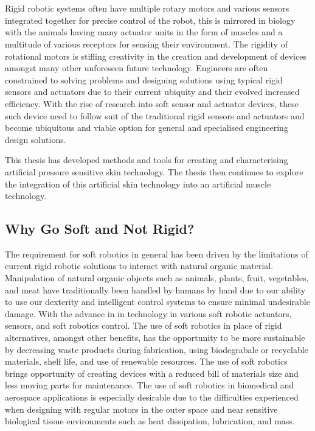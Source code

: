 \chapter{\chapiname}
\label{chapter1}
Rigid robotic systems often have multiple rotary motors and various sensors integrated together for precise control of the robot, this is mirrored in biology with the animals having many actuator units in the form of muscles and a multitude of various receptors for sensing their environment. The rigidity of rotational motors is stifling creativity in the creation and development of devices amongst many other unforeseen future technology. Engineers are often constrained to solving problems and designing solutions using typical rigid sensors and actuators due to their current ubiquity and their evolved increased efficiency. With the rise of research into soft sensor and actuator devices, these such device need to follow suit of the traditional rigid sensors and actuators and become ubiquitous and viable option for general and specialised engineering design solutions. 

This thesis has developed methods and tools for creating and characterising artificial pressure sensitive skin technology. The thesis then continues to explore the integration of this artificial skin technology into an artificial muscle technology.



\section{Why Go Soft and Not Rigid?}
The requirement for soft robotics in general has been driven by the limitations of current rigid robotic solutions to interact with natural organic material. Manipulation of natural organic objects such as animals, plants, fruit, vegetables, and meat have traditionally been handled by humans by hand due to our ability to use our dexterity and intelligent control systems to ensure minimal undesirable damage. With the advance in in technology in various soft robotic actuators\cite{Stella2023,Zhang2023,Hartmann2021,Yasa2023, Manti2016}, sensors\cite{Hegde2023}, and soft robotics control\cite{DellaSantina2023, Armanini2023}. The use of soft robotics in place of rigid alternatives, amongst other benefits, has the opportunity to be more sustainable by decreasing waste products during fabrication, using biodegrabale or recyclable materials, shelf life, and use of renewable resources\cite{Hartmann2021}. The use of soft robotics brings opportunity of creating devices with a reduced bill of materials size and less moving parts for maintenance. The use of soft robotics in biomedical and aerospace applications is especially desirable due to the difficulties experienced when designing with regular motors in the outer space and near sensitive biological tissue environments such as heat dissipation, lubrication, and mass\cite{Murugesan1981,Ashuri2020,Branz2017,Bruschi2021}. 

